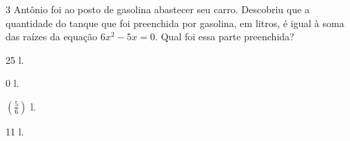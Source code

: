 














\num{3} Antônio foi ao posto de gasolina abastecer seu carro. Descobriu
que a quantidade do tanque que foi preenchida por gasolina, em litros, é igual à
soma das raízes da equação $6x^2 - 5x = 0$. Qual foi essa parte preenchida?

\begin{escolha}[itemsep=0pt]
\item 25 l.
\item 0 l.
\item $(\frac{5}{6})$ l.
\item 11 l.
\end{escolha}



